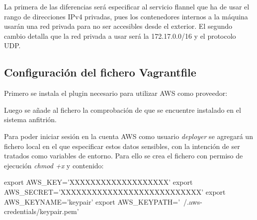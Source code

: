 La primera de las diferencias será especificar al servicio flannel que ha de usar el rango de direcciones IPv4 privadas, pues los contenedores internos a la máquina usarán una red privada para no ser accesibles desde el exterior. El segundo cambio detalla que la red privada a usar será la 172.17.0.0/16 y el protocolo UDP.


\subsection{Configuración del fichero Vagrantfile}

Primero se instala el plugin necesario para utilizar AWS como proveedor:


Luego se añade al fichero  la comprobación de que se encuentre instalado en el sistema anfitrión.

Para poder iniciar sesión en la cuenta AWS como usuario \textit{deployer} se agregará un fichero local en el que especificar estos datos sensibles, con la intención de ser tratados como variables de entorno. Para ello se crea el fichero  con permiso de ejecución \textit{chmod +x} y contenido:

\begin{codelisting}
\label{code:vagrantfile2}
\begin{code}
export AWS_KEY='XXXXXXXXXXXXXXXXXXX'
export AWS_SECRET='XXXXXXXXXXXXXXXXXXXXXXXXXXX'
export AWS_KEYNAME='keypair'
export AWS_KEYPATH='~/.aws-credentials/keypair.pem'
\end{code}
\end{codelisting}

